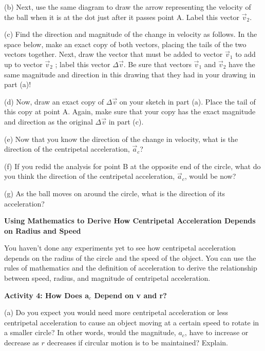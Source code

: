 (b) Next, use the same diagram to draw the arrow representing the velocity of
the ball when it is at the dot just after it passes point A. Label this vector
$\vec{v}_{2}$.

(c) Find the direction and magnitude of the change in velocity as follows. In
the space below, make an exact copy of both vectors, placing the tails of the
two vectors together. Next, draw the vector that must be added to vector $\vec{v}_{1}$
to add up to vector $\vec{v}_{2}$ ; label this vector \( \Delta  \)$\vec{v}$.
Be sure that vectors $\vec{v}_{1}$ and $\vec{v}_{2}$ have the
same magnitude and direction in this drawing that they had in your drawing in
part (a)!
\vspace{30mm}

(d) Now, draw an exact copy of \( \Delta  \)$\vec{v}$ on your sketch in part
(a). Place the tail of this copy at point A. Again, make sure that your copy
has the exact magnitude and direction as the original \( \Delta  \)$\vec{v}$
in part (c).
\vspace{20mm}

(e) Now that you know the direction of the change in velocity, what is the direction
of the centripetal acceleration, $\vec{a}_{c}$?
\vspace{20mm}

(f) If you redid the analysis for point B at the opposite end of the circle,
what do you think the direction of the centripetal acceleration, $\vec{a}_{c}$,
would be now?
\answerspace{20mm}

\pagebreak[2]
(g) As the ball moves on around the circle, what is the direction of its acceleration?
\answerspace{20mm}

\textbf{Using Mathematics to Derive How Centripetal Acceleration Depends on
Radius and Speed }

You haven't done any experiments yet to see how centripetal acceleration depends
on the radius of the circle and the speed of the object. You can use the rules
of mathematics and the definition of acceleration to derive the relationship
between speed, radius, and magnitude of centripetal acceleration. 

\textbf{Activity 4: How Does a\( _{c} \) Depend on v and r?} 

(a) Do you expect you would need more centripetal acceleration or less centripetal
acceleration to cause an object moving at a certain speed to rotate in a smaller
circle? In other words, would the magnitude, \( a_{c} \), have to increase
or decrease as $r$ decreases if circular motion is to be maintained? Explain.
\answerspace{20mm}

